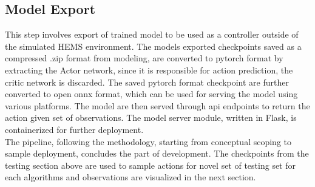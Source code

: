 \begin{large}
\section{Model Export}

This step involves export of trained model to be used as a controller outside of the simulated HEMS environment. The models exported checkpoints saved as a compressed .zip format from modeling, are converted to pytorch format by extracting the Actor network, since it is responsible for action prediction, the critic network is discarded. The saved pytorch format checkpoint are further converted to open onnx format, which can be used for serving the model using various platforms. The model are then served through api endpoints to return the action given set of observations. The model server module, written in Flask, is containerized for further deployment.  \\


The pipeline, following the methodology, starting from conceptual scoping to sample deployment, concludes the part of development. The checkpoints from the testing section above are used to sample actions for novel set of testing set for each algorithms and observations are visualized in the next section. \\
	
\end{large}
